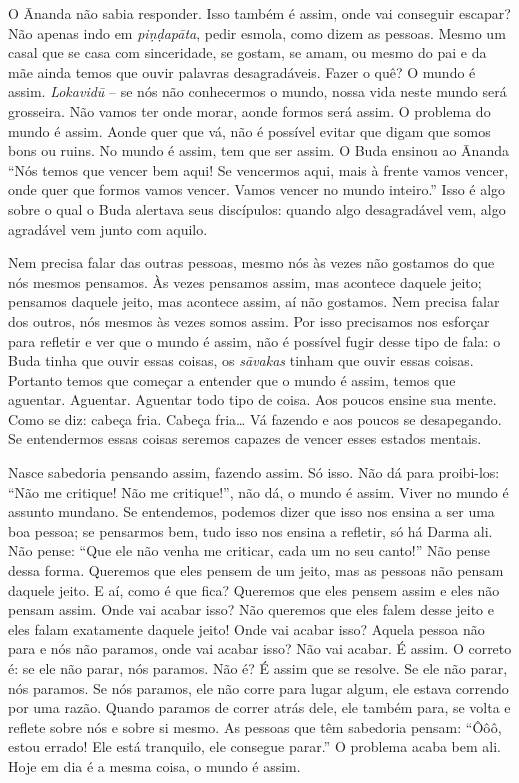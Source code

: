 O Ānanda não sabia responder. Isso também é assim, onde vai
conseguir escapar? Não apenas indo em \emph{piṇḍapāta}, pedir
esmola, como dizem as pessoas. Mesmo um casal que se casa com
sinceridade, se gostam, se amam, ou mesmo do pai e da mãe ainda temos
que ouvir palavras desagradáveis. Fazer o quê? O mundo é assim.
\emph{Lokavidū} – se nós não conhecermos o mundo, nossa vida neste
mundo será grosseira. Não vamos ter onde morar, aonde formos será
assim. O problema do mundo é assim. Aonde quer que vá, não é possível
evitar que digam que somos bons ou ruins. No mundo é assim, tem que ser
assim. O Buda ensinou ao Ānanda “Nós temos que vencer bem aqui! Se
vencermos aqui, mais à frente vamos vencer, onde quer que formos vamos
vencer. Vamos vencer no mundo inteiro.” Isso é algo sobre o qual o Buda
alertava seus discípulos: quando algo desagradável vem, algo agradável
vem junto com aquilo.

Nem precisa falar das outras pessoas, mesmo nós às vezes não
gostamos do que nós mesmos pensamos. Às vezes pensamos assim, mas
acontece daquele jeito; pensamos daquele jeito, mas acontece assim, aí
não gostamos. Nem precisa falar dos outros, nós mesmos às vezes somos
assim. Por isso precisamos nos esforçar para refletir e ver que o mundo
é assim, não é possível fugir desse tipo de fala: o Buda tinha que
ouvir essas coisas, os \emph{sāvakas} tinham que ouvir essas
coisas. Portanto temos que começar a entender que o mundo é assim,
temos que aguentar. Aguentar. Aguentar todo tipo de coisa. Aos poucos
ensine sua mente. Como se diz: cabeça fria. Cabeça fria\ldots{} Vá fazendo e
aos poucos se desapegando. Se entendermos essas coisas seremos capazes
de vencer esses estados mentais.

Nasce sabedoria pensando assim, fazendo assim. Só isso. Não dá para
proibi-los: “Não me critique! Não me critique!”, não dá, o mundo é
assim. Viver no mundo é assunto mundano. Se entendemos, podemos dizer
que isso nos ensina a ser uma boa pessoa; se pensarmos bem, tudo isso
nos ensina a refletir, só há Darma ali. Não pense: “Que ele não venha
me criticar, cada um no seu canto!” Não pense dessa forma. Queremos que
eles pensem de um jeito, mas as pessoas não pensam daquele jeito. E aí,
como é que fica? Queremos que eles pensem assim e eles não pensam
assim. Onde vai acabar isso? Não queremos que eles falem desse jeito e
eles falam exatamente daquele jeito! Onde vai acabar isso? Aquela
pessoa não para e nós não paramos, onde vai acabar isso? Não vai
acabar. É assim. O correto é: se ele não parar, nós paramos. Não é? É
assim que se resolve. Se ele não parar, nós paramos. Se nós paramos,
ele não corre para lugar algum, ele estava correndo por uma razão.
Quando paramos de correr atrás dele, ele também para, se volta e
reflete sobre nós e sobre si mesmo. As pessoas que têm sabedoria
pensam: “Ôôô, estou errado! Ele está tranquilo, ele consegue parar.” O
problema acaba bem ali. Hoje em dia é a mesma coisa, o mundo é assim.

